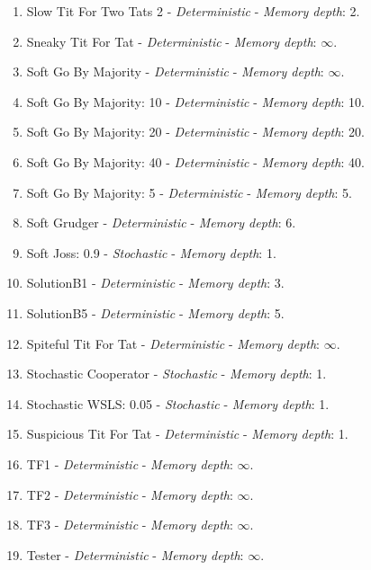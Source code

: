 \documentclass[10pt,letterpaper]{article}
\begin{document}
\begin{enumerate}
\item Slow Tit For Two Tats 2 - \textit{Deterministic} - \textit{Memory depth}: 2. \cite{Prison1998}
\item Sneaky Tit For Tat - \textit{Deterministic} - \textit{Memory depth}: \(\infty\). \cite{axelrodproject}
\item Soft Go By Majority - \textit{Deterministic} - \textit{Memory depth}: \(\infty\). \cite{Axelrod1984, Mittal2009}
\item Soft Go By Majority: 10 - \textit{Deterministic} - \textit{Memory depth}: 10. \cite{axelrodproject}
\item Soft Go By Majority: 20 - \textit{Deterministic} - \textit{Memory depth}: 20. \cite{axelrodproject}
\item Soft Go By Majority: 40 - \textit{Deterministic} - \textit{Memory depth}: 40. \cite{axelrodproject}
\item Soft Go By Majority: 5 - \textit{Deterministic} - \textit{Memory depth}: 5. \cite{axelrodproject}
\item Soft Grudger - \textit{Deterministic} - \textit{Memory depth}: 6. \cite{Li2011}
\item Soft Joss: 0.9 - \textit{Stochastic} - \textit{Memory depth}: 1. \cite{Prison1998}
\item SolutionB1 - \textit{Deterministic} - \textit{Memory depth}: 3. \cite{Ashlock2015}
\item SolutionB5 - \textit{Deterministic} - \textit{Memory depth}: 5. \cite{Ashlock2015}
\item Spiteful Tit For Tat - \textit{Deterministic} - \textit{Memory depth}: \(\infty\). \cite{Prison1998}
\item Stochastic Cooperator - \textit{Stochastic} - \textit{Memory depth}: 1. \cite{Adami2013}
\item Stochastic WSLS: 0.05 - \textit{Stochastic} - \textit{Memory depth}: 1. \cite{axelrodproject}
\item Suspicious Tit For Tat - \textit{Deterministic} - \textit{Memory depth}: 1. \cite{Beaufils1997, Hilbe2013}
\item TF1 - \textit{Deterministic} - \textit{Memory depth}: \(\infty\). \cite{axelrodproject}
\item TF2 - \textit{Deterministic} - \textit{Memory depth}: \(\infty\). \cite{axelrodproject}
\item TF3 - \textit{Deterministic} - \textit{Memory depth}: \(\infty\). \cite{axelrodproject}
\item Tester - \textit{Deterministic} - \textit{Memory depth}: \(\infty\). \cite{Axelrod1980b}

\end{enumerate}
\end{document}
